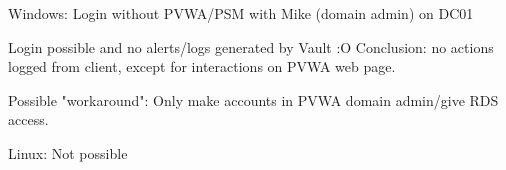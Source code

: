 Windows:
Login without PVWA/PSM with Mike (domain admin) on DC01

Login possible and no alerts/logs generated by Vault :O
Conclusion: no actions logged from client, except for interactions on PVWA web page.

Possible "workaround": Only make accounts in PVWA domain admin/give RDS access.

Linux: Not possible